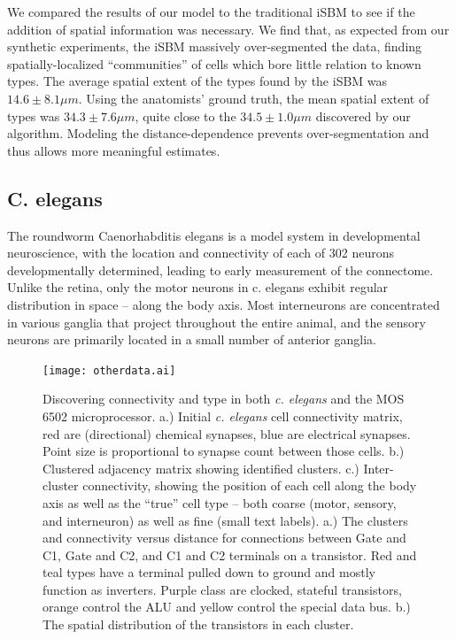 \documentclass{nature}
\begin{document}
We compared the results of our model to the traditional iSBM to see if
the addition of spatial information was necessary. We find that, as
expected from our synthetic experiments, the iSBM massively
over-segmented the data, finding spatially-localized “communities” of
cells which bore little relation to known types.  The average spatial
extent of the types found by the iSBM was $14.6\pm8.1 \mu m$. Using
the anatomists' ground truth, the mean spatial extent of types was
$34.3\pm7.6 \mu m$, quite close to the $34.5\pm 1.0 \mu m$ discovered
by our algorithm. Modeling the distance-dependence prevents
over-segmentation and thus allows more meaningful estimates.



\subsection{C. elegans}

The roundworm Caenorhabditis elegans is a model system in
developmental neuroscience\autocite{White1986}, with the location and
connectivity of each of 302 neurons developmentally determined,
leading to early measurement of the connectome. Unlike the retina,
only the motor neurons in c. elegans exhibit regular distribution in
space -- along the body axis. Most interneurons are
concentrated in various ganglia that project throughout the entire
animal, and the sensory neurons are primarily located in a small
number of anterior ganglia.

\begin{figure}
  \centering 
  \centerline{\texttt{[image: otherdata.ai]}}
  \caption{Discovering connectivity and type in both
    \textit{c. elegans} and the MOS 6502 microprocessor.  a.) Initial
    \textit{c. elegans} cell connectivity matrix, red are
    (directional) chemical synapses, blue are electrical
    synapses. Point size is proportional to synapse count between
    those cells. b.) Clustered adjacency matrix showing identified
    clusters. c.) Inter-cluster connectivity, showing the position of
    each cell along the body axis as well as the ``true'' cell type --
    both coarse (motor, sensory, and interneuron) as well as fine
    (small text labels). a.) The clusters and connectivity versus
    distance for connections between Gate and C1, Gate and C2, and C1
    and C2 terminals on a transistor. Red and teal types have a
    terminal pulled down to ground and mostly function as
    inverters. Purple class are clocked, stateful transistors, orange
    control the ALU and yellow control the special data bus. b.) The
    spatial distribution of the transistors in each cluster.}
  \label{fig:otherdata}
\end{figure}
\end{document}
